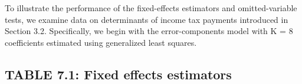 \documentclass[]{book}
\newenvironment{Shaded}{\begin{snugshade}}{\end{snugshade}}
\newcommand{\DataTypeTok}[1]{\textcolor[rgb]{0.13,0.29,0.53}{#1}}
\newcommand{\DecValTok}[1]{\textcolor[rgb]{0.00,0.00,0.81}{#1}}
\newcommand{\KeywordTok}[1]{\textcolor[rgb]{0.13,0.29,0.53}{\textbf{#1}}}
\newcommand{\NormalTok}[1]{#1}
\newcommand{\OperatorTok}[1]{\textcolor[rgb]{0.81,0.36,0.00}{\textbf{#1}}}
\begin{document}
To illustrate the performance of the fixed-effects estimators and omitted-variable tests, we examine data on determinants of income tax payments introduced in Section 3.2. Specifically, we begin with the error-components model with K = 8 coefficients estimated using generalized least squares.

\hypertarget{table-7.1-fixed-effects-estimators}{%
\subsection{TABLE 7.1: Fixed effects estimators}\label{table-7.1-fixed-effects-estimators}}

\begin{Shaded}
\end{Shaded}
\end{document}
